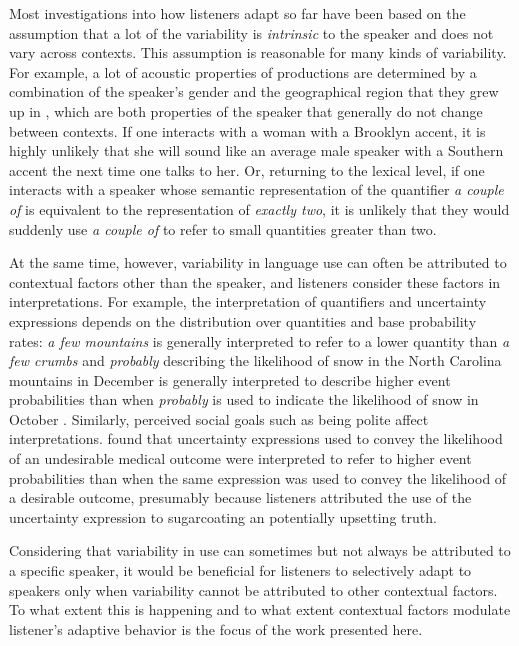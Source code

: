 \documentclass[man,floatsintext]{apa6}
\begin{document}
Most investigations into how listeners adapt so far have been based on the assumption that a lot of the variability is \textit{intrinsic} to the speaker and does not vary across contexts. This assumption is reasonable for many kinds of variability. For example, a lot of acoustic properties of productions are determined by a combination of the speaker's gender and the geographical region that they grew up in \cite{Kleinschmidt2019}, which are both properties of the speaker that generally do not change between contexts. If one interacts with a woman with a Brooklyn accent, it is highly unlikely that she will sound like an average male speaker with a Southern accent the next time one talks to her. Or, returning to the lexical level, if one interacts with a speaker whose semantic representation of the quantifier \textit{a couple of} is equivalent to the representation of \textit{exactly two}, it is unlikely that they would suddenly use \textit{a couple of} to refer to small quantities greater than two.

At the same time, however, variability in language use can often be attributed to contextual factors other than the speaker, and listeners consider these factors in interpretations. 
For example, the interpretation of quantifiers and uncertainty expressions depends on the distribution over quantities and base probability rates: \textit{a few mountains} is generally interpreted to refer to a lower quantity than \textit{a few crumbs} \cite{Clark1991,Scholler2017} and \textit{probably} describing the likelihood of snow in the North Carolina mountains in December is generally interpreted to describe higher event probabilities than when \textit{probably} is used to indicate the likelihood of snow in October \cite{Wallsten1986b}. Similarly, perceived social goals such as being polite affect interpretations. \cite{Pighin2011} found that uncertainty expressions used to convey the likelihood of an undesirable medical outcome were interpreted to refer to higher event probabilities than when the same expression was used to convey the likelihood of a desirable outcome, presumably because listeners attributed the use of the uncertainty expression to sugarcoating an potentially upsetting truth.

Considering that variability in use can sometimes but not always be attributed to a specific speaker, it would be beneficial for listeners to selectively adapt to speakers only when variability cannot be attributed to other contextual factors. To what extent this is happening and to what extent contextual factors modulate listener's adaptive behavior is the focus of the work presented here. 
\end{document}
